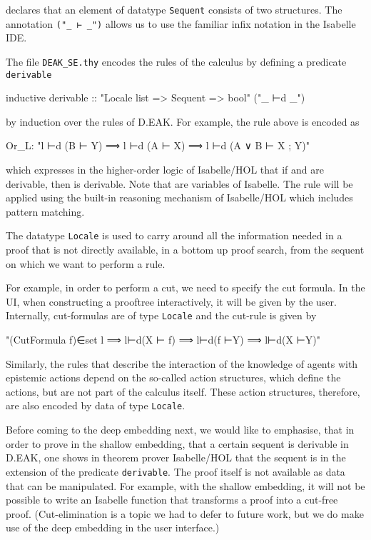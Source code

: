 \documentclass[runningheads,a4paper]{llncs}
\begin{document}
\noindent declares that an element of datatype \texttt{Sequent} consists of two structures. The annotation \texttt{("\_ ⊢ \_")} allows us to use the familiar infix notation  in the Isabelle IDE. 

The file \texttt{DEAK\_SE.thy} encodes the rules of the calculus by defining a predicate \texttt{derivable}

\begin{pyglist}[language = isabelle]
inductive derivable :: "Locale list => Sequent => bool"  ("_ ⊢d _")
\end{pyglist}
\noindent by induction over the rules of D.EAK. For example, the rule  above is encoded as

\begin{pyglist}[language = isabelle]
Or_L:  "l ⊢d (B ⊢ Y) ⟹ l ⊢d (A ⊢ X) ⟹ l ⊢d (A ∨ B ⊢ X ; Y)"
\end{pyglist}
\noindent which expresses in the higher-order logic of Isabelle/HOL that if  and  are derivable, then  is derivable.
Note that  are variables of Isabelle. The rule will be applied using the built-in reasoning mechanism of Isabelle/HOL which includes pattern matching. 

The datatype \texttt{Locale} is used to carry around all the information needed in a proof that is not directly available, in a bottom up proof search, from the sequent on which we want to perform a rule.

For example, in order to perform a cut, we need to specify the cut formula. In the UI, when constructing a prooftree interactively, it will be given by the user. Internally, cut-formulas are of type \texttt{Locale}  and the cut-rule is given by

\begin{pyglist}[language = json]
"(CutFormula f)∈set l ⟹ l⊢d(X ⊢ f) ⟹ l⊢d(f ⊢Y) ⟹ l⊢d(X ⊢Y)"
\end{pyglist}

Similarly, the rules that describe the interaction of the knowledge of agents with epistemic actions depend on the so-called action structures, which define the actions, but are not part of the calculus itself. These action structures, therefore, are also encoded by data of type \texttt{Locale}.

Before coming to the deep embedding next, we would like to emphasise, that in order to prove in the shallow embedding, that a certain sequent is derivable in D.EAK, one shows in theorem prover Isabelle/HOL that the sequent is in the extension of the predicate \texttt{derivable}. The proof itself is not available as data that can be manipulated. For example, with the shallow embedding, it will not be possible to write an Isabelle function that transforms a proof into a cut-free proof. (Cut-elimination is a topic we had to defer to future work, but we do make use of the deep embedding in the user interface.) 
\end{document}
